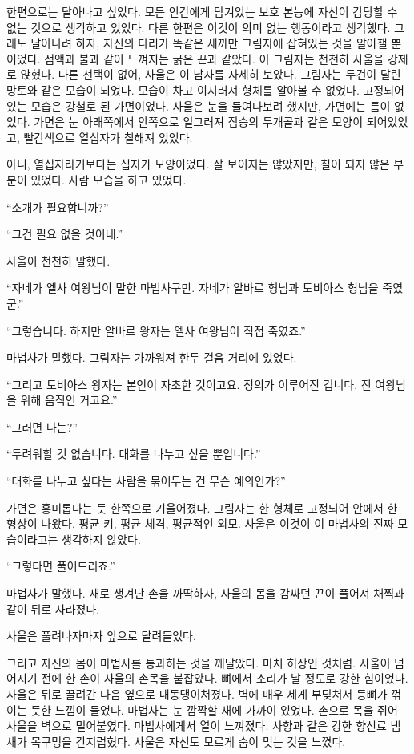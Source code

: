 한편으로는 달아나고 싶었다. 모든 인간에게 담겨있는 보호 본능에 자신이 감당할 수 없는 것으로 생각하고 있었다. 다른 한편은 이것이 의미 없는 행동이라고 생각했다. 그래도 달아나려 하자, 자신의 다리가 똑같은 새까만 그림자에 잡혀있는 것을 알아챌 뿐이었다. 점액과 불과 같이 느껴지는 굵은 끈과 같았다. 이 그림자는 천천히 사울을 강제로 앉혔다. 다른 선택이 없어, 사울은 이 남자를 자세히 보았다. 그림자는 두건이 달린 망토와 같은 모습이 되었다. 모습이 차고 이지러져 형체를 알아볼 수 없었다. 고정되어있는 모습은 강철로 된 가면이었다. 사울은 눈을 들여다보려 했지만, 가면에는 틈이 없었다. 가면은 눈 아래쪽에서 안쪽으로 일그러져 짐승의 두개골과 같은 모양이 되어있었고, 빨간색으로 열십자가 칠해져 있었다.

아니, 열십자라기보다는 십자가 모양이었다. 잘 보이지는 않았지만, 칠이 되지 않은 부분이 있었다. 사람 모습을 하고 있었다.

``소개가 필요합니까?''

``그건 필요 없을 것이네.''

사울이 천천히 말했다.

``자네가 엘사 여왕님이 말한 마법사구만. 자네가 알바르 형님과 토비아스 형님을 죽였군.''

``그렇습니다. 하지만 알바르 왕자는 엘사 여왕님이 직접 죽였죠.''

마법사가 말했다. 그림자는 가까워져 한두 걸음 거리에 있었다.

``그리고 토비아스 왕자는 본인이 자초한 것이고요. 정의가 이루어진 겁니다. 전 여왕님을 위해 움직인 거고요.''

``그러면 나는?''

``두려워할 것 없습니다. 대화를 나누고 싶을 뿐입니다.''

``대화를 나누고 싶다는 사람을 묶어두는 건 무슨 예의인가?''

가면은 흥미롭다는 듯 한쪽으로 기울어졌다. 그림자는 한 형체로 고정되어 안에서 한 형상이 나왔다. 평균 키, 평균 체격, 평균적인 외모. 사울은 이것이 이 마법사의 진짜 모습이라고는 생각하지 않았다.

``그렇다면 풀어드리죠.''

마법사가 말했다. 새로 생겨난 손을 까딱하자, 사울의 몸을 감싸던 끈이 풀어져 채찍과 같이 뒤로 사라졌다.

사울은 풀려나자마자 앞으로 달려들었다.

그리고 자신의 몸이 마법사를 통과하는 것을 깨달았다. 마치 허상인 것처럼. 사울이 넘어지기 전에 한 손이 사울의 손목을 붙잡았다. 뼈에서 소리가 날 정도로 강한 힘이었다. 사울은 뒤로 끌려간 다음 옆으로 내동댕이쳐졌다. 벽에 매우 세게 부딪쳐서 등뼈가 꺾이는 듯한 느낌이 들었다. 마법사는 눈 깜짝할 새에 가까이 있었다. 손으로 목을 쥐어 사울을 벽으로 밀어붙였다. 마법사에게서 열이 느껴졌다. 사향과 같은 강한 향신료 냄새가 목구멍을 간지럽혔다. 사울은 자신도 모르게 숨이 멎는 것을 느꼈다.


